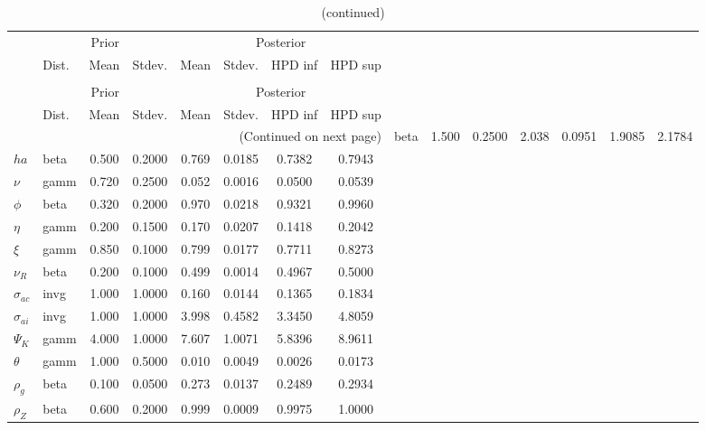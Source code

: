  
\begin{center}
\begin{longtable}{llcccccc} 
\caption{Results from Metropolis-Hastings (parameters)}
 \label{Table:MHPosterior:1}\\
\toprule 
  & \multicolumn{3}{c}{Prior}  &  \multicolumn{4}{c}{Posterior} \\
  \cmidrule(r{.75em}){2-4} \cmidrule(r{.75em}){5-8}
  & Dist. & Mean  & Stdev. & Mean & Stdev. & HPD inf & HPD sup\\
\midrule \endfirsthead 
\caption{(continued)}\\\toprule 
  & \multicolumn{3}{c}{Prior}  &  \multicolumn{4}{c}{Posterior} \\
  \cmidrule(r{.75em}){2-4} \cmidrule(r{.75em}){5-8}
  & Dist. & Mean  & Stdev. & Mean & Stdev. & HPD inf & HPD sup\\
\midrule \endhead 
\bottomrule \multicolumn{8}{r}{(Continued on next page)} \endfoot 
\bottomrule \endlastfoot 
${\sigma}$ & beta &   1.500 & 0.2500 &   2.038& 0.0951 &  1.9085 &  2.1784 \\ 
${ha}$ & beta &   0.500 & 0.2000 &   0.769& 0.0185 &  0.7382 &  0.7943 \\ 
$\nu$ & gamm &   0.720 & 0.2500 &   0.052& 0.0016 &  0.0500 &  0.0539 \\ 
${\phi}$ & beta &   0.320 & 0.2000 &   0.970& 0.0218 &  0.9321 &  0.9960 \\ 
${\eta}$ & gamm &   0.200 & 0.1500 &   0.170& 0.0207 &  0.1418 &  0.2042 \\ 
$\xi$ & gamm &   0.850 & 0.1000 &   0.799& 0.0177 &  0.7711 &  0.8273 \\ 
${\nu_R}$ & beta &   0.200 & 0.1000 &   0.499& 0.0014 &  0.4967 &  0.5000 \\ 
${\sigma_{ac}}$ & invg &   1.000 & 1.0000 &   0.160& 0.0144 &  0.1365 &  0.1834 \\ 
${\sigma_{ai}}$ & invg &   1.000 & 1.0000 &   3.998& 0.4582 &  3.3450 &  4.8059 \\ 
${\Psi_{K}}$ & gamm &   4.000 & 1.0000 &   7.607& 1.0071 &  5.8396 &  8.9611 \\ 
${\theta}$ & gamm &   1.000 & 0.5000 &   0.010& 0.0049 &  0.0026 &  0.0173 \\ 
${\rho_g}$ & beta &   0.100 & 0.0500 &   0.273& 0.0137 &  0.2489 &  0.2934 \\ 
${\rho_Z}$ & beta &   0.600 & 0.2000 &   0.999& 0.0009 &  0.9975 &  1.0000 \\ 

\end{longtable}
\end{center}
